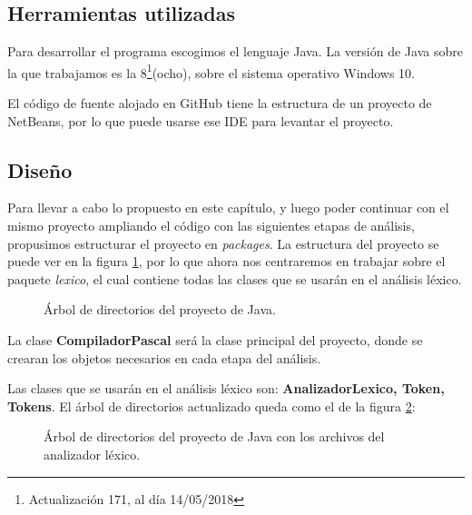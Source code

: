 \subsection{Herramientas utilizadas} %
Para desarrollar el programa escogimos el lenguaje Java. La versión de Java sobre la que trabajamos es la 8\footnote{Actualización 171, al día 14/05/2018}(ocho), sobre el sistema operativo Windows 10. 

El código de fuente alojado en GitHub tiene la estructura de un proyecto de NetBeans, por lo que puede usarse ese IDE para levantar el proyecto.

\subsection{Diseño}
Para llevar a cabo lo propuesto en este capítulo, y luego poder continuar con el mismo proyecto ampliando el código con las siguientes etapas de análisis, propusimos estructurar el proyecto en \emph{packages}. La estructura del proyecto se puede ver en la figura \ref{fig:arbol_dir}, por lo que ahora nos centraremos en trabajar sobre el paquete \emph{lexico}, el cual contiene todas las clases que se usarán en el análisis léxico.

\begin{figure}[H]
\caption{Árbol de directorios del proyecto de Java.}
\label{fig:arbol_dir}
\end{figure}
La clase {\bf CompiladorPascal} será la clase principal del proyecto, donde se crearan los objetos necesarios en cada etapa del análisis. 

Las clases que se usarán en el análisis léxico son: {\bf AnalizadorLexico, Token, Tokens}. El árbol de directorios actualizado queda como el de la figura \ref{fig:arbol_dir_2}:
\begin{figure}[H]
\caption{Árbol de directorios del proyecto de Java con los archivos del analizador léxico.}
\label{fig:arbol_dir_2}
\end{figure}

